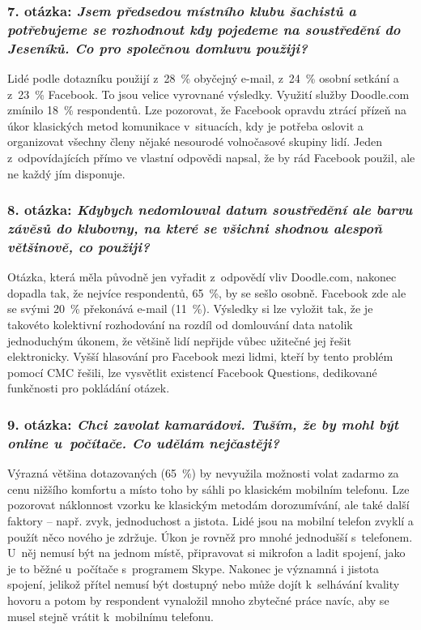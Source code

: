 \documentclass[12pt,oneside,final]{fithesis2}
\begin{document}
\subsubsection*{\textbf{7. otázka:} \emph{Jsem předsedou místního klubu šachistů a potřebujeme se rozhodnout kdy pojedeme na soustředění do Jeseníků. Co pro společnou domluvu použiji?}}
Lidé podle dotazníku použijí z~28~\% obyčejný e-mail, z~24~\% osobní setkání a z~23~\% Facebook. To jsou velice vyrovnané výsledky. Využití služby Doodle.com zmínilo 18~\% respondentů. Lze pozorovat, že Facebook opravdu ztrácí přízeň na úkor klasických metod komunikace v~situacích, kdy je potřeba oslovit a or\-ga\-ni\-zo\-vat všech\-ny členy nějaké nesourodé volnočasové skupiny lidí. Jeden z~odpovídajících přímo ve vlastní odpovědi napsal, že by rád Facebook použil, ale ne každý jím disponuje.

\subsubsection*{\textbf{8. otázka:} \emph{Kdybych nedomlouval datum soustředění ale barvu závěsů do klu\-bov\-ny, na které se všichni shodnou alespoň většinově, co použiji?}}
Otázka, která měla původně jen vyřadit z~odpovědí vliv Doodle.com, na\-ko\-nec do\-pad\-la tak, že nejvíce respondentů, 65~\%, by se sešlo osobně. Facebook zde ale se svými 20~\% překonává e-mail (11~\%). Výsledky si lze vyložit tak, že je takovéto kolektivní rozhodování na rozdíl od domlouvání data natolik jednoduchým úkonem, že většině lidí nepřijde vůbec užitečné jej řešit elektronicky. Vyšší hlasování pro Facebook mezi lidmi, kteří by tento problém pomocí CMC řešili, lze vysvětlit existencí Facebook Questions, dedikované funkčnosti pro pokládání otázek.

\subsubsection*{\textbf{9. otázka:} \emph{Chci zavolat kamarádovi. Tuším, že by mohl být online u~počítače. Co udělám nejčastěji?}}
Výrazná většina dotazovaných (65~\%) by nevyužila možnosti volat zadarmo za cenu nižšího komfortu a místo toho by sáhli po klasickém mobilním telefonu. Lze pozorovat náklonnost vzorku ke klasickým metodám dorozumívání, ale také další faktory -- např. zvyk, jednoduchost a jistota. Lidé jsou na mobilní telefon zvyklí a použít něco nového je zdržuje. Úkon je rovněž pro mnohé jednodušší s~telefonem. U~něj nemusí být na jednom místě, připravovat si mikrofon a ladit spojení, jako je to běžné u~počítače s~programem Skype. Nakonec je významná i jistota spojení, jelikož přítel nemusí být dostupný nebo může dojít k~selhávání kvality hovoru a potom by respondent vynaložil mnoho zbytečné práce navíc, aby se musel stejně vrátit k~mobilnímu telefonu.
\end{document}
